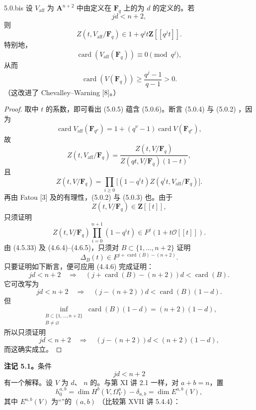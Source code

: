 \begin{SGAresult}{}{5.0.bis}
设 $V_{\mathrm{aff}}$ 为 $\mathbf A^{n+2}$ 中由定义在 $\mathbf F_q$ 上的为 $d$ 的定义的。若
\[
jd<n+2,\tag{5.0.7}
\]
则
\[
Z(t,V_{\mathrm{aff}}/\mathbf F_q)\in1+q^jt\mathbf Z[[q^jt]].\tag{5.0.5}
\]
特别地，
\[
\operatorname{card}(V_{\mathrm{aff}}(\mathbf F_q))\equiv0\pmod{q^j},\tag{5.0.6}
\]
从而
\[
\operatorname{card}(V(\mathbf F_q))\ge\frac{q^j-1}{q-1}>0.\tag{5.0.6 bis}
\]
（这改进了 Chevalley--Warning  [8]。）
\end{SGAresult}
\begin{proof}
取中 $t$ 的系数，即可看出 (5.0.5) 蕴含 (5.0.6)。断言 (5.0.4) 与 (5.0.2) ，因为
\[
\operatorname{card}V_{\mathrm{aff}}(\mathbf F_{q^\nu})
=1+(q^\nu-1)\operatorname{card}V(\mathbf F_{q^\nu}),\tag{5.0.7}
\]
故
\[
Z(t,V_{\mathrm{aff}}/\mathbf F_q)=\frac{Z(t,V/\mathbf F_q)}{Z(qt,V/\mathbf F_q)(1-t)},\tag{5.0.8}
\]
且
\[
Z(t,V/\mathbf F_q)=\prod_{i\ge0}\bigl[(1-q^it)Z(q^it,V_{\mathrm{aff}}/\mathbf F_q)\bigr].\tag{5.0.9}
\]
再由 Fatou  [3] 及的有理性，(5.0.2) 与 (5.0.3) 也。由于
\[
Z(t,V/\mathbf F_q)\in\mathbf Z[[t]],\tag{5.0.10}
\]
只须证明
\[
Z(t,V/\mathbf F_q)\prod_{i=0}^{n+1}(1-q^it)\in F^j(1+t\mathscr O[[t]]).\tag{5.0.11}
\]
由 (4.5.33) 及 (4.6.4)--(4.6.5)，只须对 $B\subset\{1,\ldots,n+2\}$ 证明
\[
\Delta_B(t)\in F^{j+\operatorname{card}(B)-(n+2)}.\tag{5.0.12}
\]
只要证明如下断言，便可应用 (4.4.6) 完成证明：
\[
jd<n+2\quad\Longrightarrow\quad
(j+\operatorname{card}(B)-(n+2))d<\operatorname{card}(B).\tag{5.0.13}
\]
它可改写为
\[
jd<n+2\quad\Longrightarrow\quad(j-(n+2))d<\operatorname{card}(B)(1-d).\tag{5.0.14}
\]
但
\[
\inf_{\substack{B\subset\{1,\ldots,n+2\}\\B\ne\varnothing}}
\operatorname{card}(B)(1-d)=(n+2)(1-d),
\]
所以只须证明
\[
jd<n+2\quad\Longrightarrow\quad(j-(n+2))d<(n+2)(1-d),\tag{5.0.15}
\]
而这确实成立。
\end{proof}
\textbf{注记 5.1。}条件
\[
jd<n+2\tag{5.1.1}
\]
有一个解释。设 $V$ 为 $d$、 $n$ 的。与第 XI 讲 2.1 一样，对 $a+b=n$，置
\[
h_0^{a,b}=\dim H^b(V,\Omega_V^a)-\delta_{a,b}=\dim E^{a,b}(V),\tag{5.1.2}
\]
其中 $E^{a,b}(V)$ 为“”的 $(a,b)$ （比较第 XVII 讲 5.4.4）：
